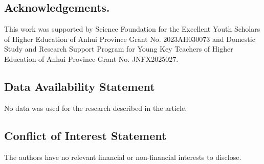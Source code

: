 \documentclass[11pt,reqno]{amsart}
\numberwithin{Thm}{section}
\begin{document}
\subsection*{Acknowledgements.}
This work was supported by Science Foundation for the Excellent Youth Scholars of Higher Education of Anhui Province Grant No. 2023AH030073 and Domestic Study and Research Support Program for Young Key Teachers of Higher Education of Anhui Province Grant No. JNFX2025027.


\subsection*{Data Availability Statement}
No data was used for the research described in the article.


\subsection*{Conflict of Interest Statement}
The authors have no relevant financial or non-financial interests to disclose.

 \vspace {0.1cm}
\end{document}
